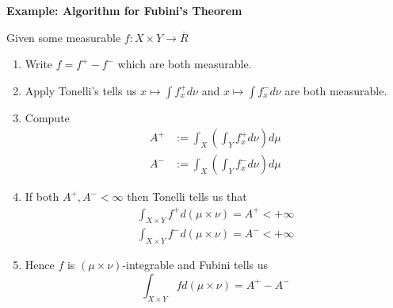 \documentclass[11pt]{article}
\newcommand{\defeq}{:=}
\newenvironment{eg}
{\begin{mdframed}[backgroundcolor=mylg,roundcorner=5pt,linewidth=0pt]\bfseries{Example:}\normalfont}
	{\end{mdframed}}
\begin{document}
\begin{eg}
	\textbf{Algorithm for Fubini's Theorem}

	Given some measurable $f:X\times Y \to \overline{R}$
	\begin{enumerate}
		\item Write $f=f^+ - f^-$ which are both measurable.
		\item Apply Tonelli's tells us $x\mapsto \int f^+_x d\nu $ and $x\mapsto\int f^-_x d\nu$ are both measurable.
		\item Compute 
			\begin{align*}
				A^+&\defeq \int_X\left(\int_Y f^+_x d \nu\right) d\mu\\
				A^-&\defeq \int_X\left(\int_Y f^-_x d \nu\right) d\mu
			\end{align*}
		\item If both $A^+, A^- < \infty$ then Tonelli tells us that
			\begin{align*}
				\int_{X\times Y} f^+ d(\mu\times \nu)= A^+ < +\infty\\
				\int_{X\times Y} f^- d(\mu\times \nu)= A^- < +\infty	
			\end{align*}
		\item Hence $f$ is $(\mu\times\nu)$-integrable and Fubini tells us
			\[
				\int_{X\times Y} f d(\mu\times\nu)= A^+ - A^-
			\]
	\end{enumerate}
\end{eg}
\end{document}
